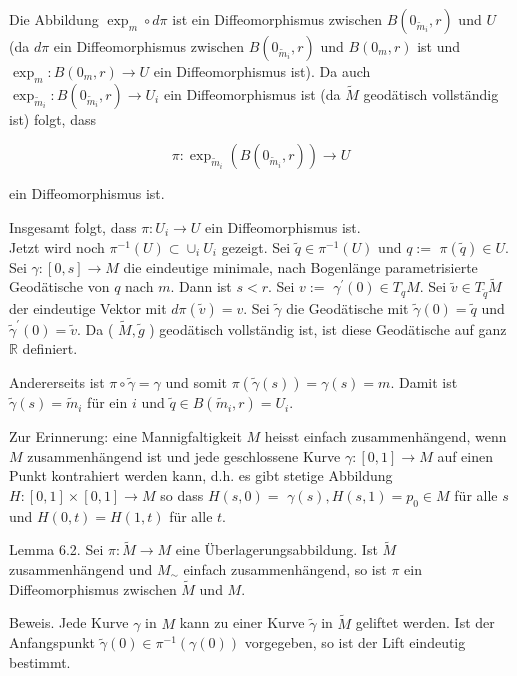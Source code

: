 \documentclass[10pt]{article}
\begin{document}
Die Abbildung $\exp _{m} \circ d \pi$ ist ein Diffeomorphismus zwischen $B\left(0_{\tilde{m}_{i}}, r\right)$ und $U$ (da $d \pi$ ein Diffeomorphismus zwischen $B\left(0_{\tilde{m}_{i}}, r\right)$ und $B\left(0_{m}, r\right)$ ist und $\exp _{m}: B\left(0_{m}, r\right) \rightarrow U$ ein Diffeomorphismus ist). Da auch $\exp _{\tilde{m}_{i}}: B\left(0_{\tilde{m}_{i}}, r\right) \rightarrow U_{i}$ ein Diffeomorphismus ist (da $\tilde{M}$ geodätisch vollständig ist) folgt, dass

$$
\pi: \exp _{\tilde{m}_{i}}\left(B\left(0_{\tilde{m}_{i}}, r\right)\right) \rightarrow U
$$

ein Diffeomorphismus ist.

Insgesamt folgt, dass $\pi: U_{i} \rightarrow U$ ein Diffeomorphismus ist.\\
Jetzt wird noch $\pi^{-1}(U) \subset \cup_{i} U_{i}$ gezeigt. Sei $\tilde{q} \in \pi^{-1}(U)$ und $q:=$ $\pi(\tilde{q}) \in U$. Sei $\gamma:[0, s] \rightarrow M$ die eindeutige minimale, nach Bogenlänge parametrisierte Geodätische von $q$ nach $m$. Dann ist $s<r$. Sei $v:=$ $\gamma^{\prime}(0) \in T_{q} M$. Sei $\tilde{v} \in T_{\tilde{q}} \tilde{M}$ der eindeutige Vektor mit $d \pi(\tilde{v})=v$. Sei $\tilde{\gamma}$ die Geodätische mit $\tilde{\gamma}(0)=\tilde{q}$ und $\tilde{\gamma}^{\prime}(0)=\tilde{v}$. Da ( $\tilde{M}, \tilde{g}$ ) geodätisch vollständig ist, ist diese Geodätische auf ganz $\mathbb{R}$ definiert.

Andererseits ist $\pi \circ \tilde{\gamma}=\gamma$ und somit $\pi(\tilde{\gamma}(s))=\gamma(s)=m$. Damit ist $\tilde{\gamma}(s)=\tilde{m}_{i}$ für ein $i$ und $\tilde{q} \in B\left(\tilde{m}_{i}, r\right)=U_{i}$.

Zur Erinnerung: eine Mannigfaltigkeit $M$ heisst einfach zusammenhängend, wenn $M$ zusammenhängend ist und jede geschlossene Kurve $\gamma:[0,1] \rightarrow M$ auf einen Punkt kontrahiert werden kann, d.h. es gibt stetige Abbildung $H:[0,1] \times[0,1] \rightarrow M$ so dass $H(s, 0)=$ $\gamma(s), H(s, 1)=p_{0} \in M$ für alle $s$ und $H(0, t)=H(1, t)$ für alle $t$.

Lemma 6.2. Sei $\pi: \tilde{M} \rightarrow M$ eine Überlagerungsabbildung. Ist $\tilde{M}$ zusammenhängend und $M_{\sim}$ einfach zusammenhängend, so ist $\pi$ ein Diffeomorphismus zwischen $\tilde{M}$ und $M$.

Beweis. Jede Kurve $\gamma$ in $M$ kann zu einer Kurve $\tilde{\gamma}$ in $\tilde{M}$ geliftet werden. Ist der Anfangspunkt $\tilde{\gamma}(0) \in \pi^{-1}(\gamma(0))$ vorgegeben, so ist der Lift eindeutig bestimmt.
\end{document}
